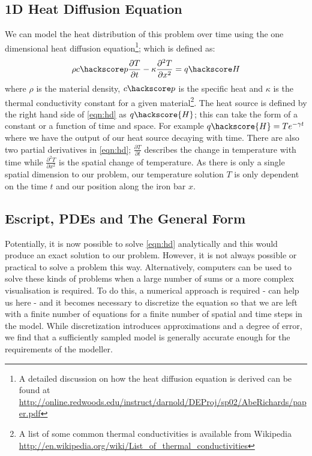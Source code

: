 \subsection{1D Heat Diffusion Equation}
We can model the heat distribution of this problem over time using the one dimensional heat diffusion equation\footnote{A detailed discussion on how the heat diffusion equation is derived can be found at \url{http://online.redwoods.edu/instruct/darnold/DEProj/sp02/AbeRichards/paper.pdf}};
which is defined as:
\begin{equation}
\rho c\hackscore p \frac{\partial T}{\partial t} - \kappa \frac{\partial^{2} T}{\partial x^{2}} = q\hackscore H 
\label{eqn:hd}
\end{equation}
where $\rho$ is the material density, $c\hackscore p$ is the specific heat and $\kappa$ is the thermal conductivity constant for a given material\footnote{A list of some common thermal conductivities is available from Wikipedia \url{http://en.wikipedia.org/wiki/List_of_thermal_conductivities}}. 
The heat source is defined by the right hand side of \ref{eqn:hd} as $q\hackscore{H}$; this can take the form of a constant or a function of time and space. For example $q\hackscore{H} = Te^{-\gamma t}$ where we have the output of our heat source decaying with time. There are also two partial derivatives in \ref{eqn:hd}; $\frac{\partial T}{\partial t}$ describes the change in temperature with time while $\frac{\partial ^2 T}{\partial x^2}$ is the spatial change of temperature. As there is only a single spatial dimension to our problem, our temperature solution $T$ is only dependent on the time $t$ and our position along the iron bar $x$.

\subsection{Escript, PDEs and The General Form}
Potentially, it is now possible to solve \ref{eqn:hd} analytically and this would produce an exact solution to our problem. However, it is not always possible or practical to solve a problem this way. Alternatively, computers can be used to solve these kinds of problems when a large number of sums or a more complex visualisation is required. To do this, a numerical approach is required - \ESCRIPT can help us here -  and it becomes necessary to discretize the equation so that we are left with a finite number of equations for a finite number of spatial and time steps in the model. While discretization introduces approximations and a degree of error, we find that a sufficiently sampled model is generally accurate enough for the requirements of the modeller.

